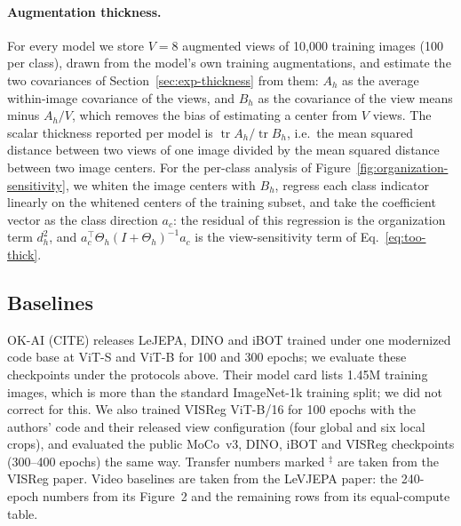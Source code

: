 \documentclass{article} %
\theoremstyle{remark}
\begin{document}
\paragraph{Augmentation thickness.}
For every model we store $V=8$ augmented views of 10{,}000 training images (100 per class), drawn from the model's own training augmentations, and estimate the two covariances of Section~\ref{sec:exp-thickness} from them: $A_h$ as the average within-image covariance of the views, and $B_h$ as the covariance of the view means minus $A_h/V$, which removes the bias of estimating a center from $V$ views. The scalar thickness reported per model is $\operatorname{tr}A_h/\operatorname{tr}B_h$, i.e.\ the mean squared distance between two views of one image divided by the mean squared distance between two image centers. For the per-class analysis of Figure~\ref{fig:organization-sensitivity}, we whiten the image centers with $B_h$, regress each class indicator linearly on the whitened centers of the training subset, and take the coefficient vector as the class direction $a_c$: the residual of this regression is the organization term $d_h^2$, and $a_c^\top\Theta_h(I+\Theta_h)^{-1}a_c$ is the view-sensitivity term of Eq.~\eqref{eq:too-thick}.

\subsection{Baselines}
OK-AI (CITE) releases LeJEPA, DINO and iBOT trained under one modernized code base at ViT-S and ViT-B for 100 and 300 epochs; we evaluate these checkpoints under the protocols above. Their model card lists 1.45M training images, which is more than the standard ImageNet-1k training split; we did not correct for this. We also trained VISReg ViT-B/16 for 100 epochs with the authors' code and their released view configuration (four global and six local crops), and evaluated the public MoCo~v3, DINO, iBOT and VISReg checkpoints (300--400 epochs) the same way. Transfer numbers marked $^\ddag$ are taken from the VISReg paper. Video baselines are taken from the LeVJEPA paper: the 240-epoch numbers from its Figure~2 and the remaining rows from its equal-compute table.
\end{document}
